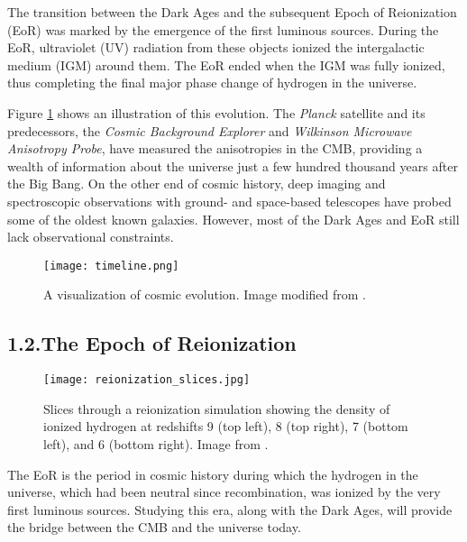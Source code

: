 \documentclass[12pt]{article}
\begin{document}
The transition between the Dark Ages and the subsequent Epoch of Reionization (EoR) was marked by the emergence of the first luminous sources. During the EoR, ultraviolet (UV) radiation from these objects ionized the intergalactic medium (IGM) around them. The EoR ended when the IGM was fully ionized, thus completing the final major phase change of hydrogen in the universe.

Figure \ref{fig:timeline} shows an illustration of this evolution. The \textit{Planck} satellite and its predecessors, the \textit{Cosmic Background Explorer} and \textit{Wilkinson Microwave Anisotropy Probe}, have measured the anisotropies in the CMB, providing a wealth of information about the universe just a few hundred thousand years after the Big Bang. On the other end of cosmic history, deep imaging and spectroscopic observations with ground- and space-based telescopes have probed some of the oldest known galaxies. However, most of the Dark Ages and EoR still lack observational constraints. \vspace{3mm}

\begin{figure}[tb]
	\centering
	\texttt{[image: timeline.png]}
	\caption[History of the universe]{A visualization of cosmic evolution. Image modified from \cite{loeb2006}.}
	\label{fig:timeline}
\end{figure}

\tocless\subsection{\hypertarget{subsec:eor}{1.2.\hspace{0.75em}The Epoch of Reionization}}

\begin{figure}[t]
	\centering
	\texttt{[image: reionization\_slices.jpg]}
	\caption[Redshift slices through a simulation showing the evolution of ionized hydrogen]{Slices through a reionization simulation showing the density of ionized hydrogen at redshifts 9 (top left), 8 (top right), 7 (bottom left), and 6 (bottom right). Image from \cite{trac2007}.}
	\label{fig:reionization}
\end{figure}

The EoR is the period in cosmic history during which the hydrogen in the universe, which had been neutral since recombination, was ionized by the very first luminous sources. Studying this era, along with the Dark Ages, will provide the bridge between the CMB and the universe today.
\end{document}
